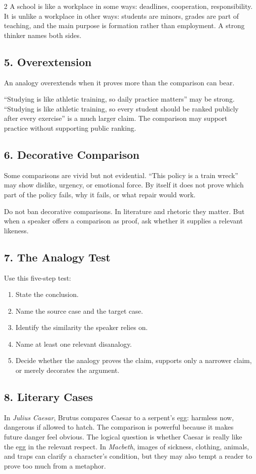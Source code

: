 \documentclass[12pt]{article}
\begin{document}
\begin{multicols}{2}
A school is like a workplace in some ways: deadlines, cooperation, responsibility. It is unlike a workplace in other ways: students are minors, grades are part of teaching, and the main purpose is formation rather than employment. A strong thinker names both sides.

\subsection*{5. Overextension}
An analogy overextends when it proves more than the comparison can bear.

``Studying is like athletic training, so daily practice matters'' may be strong. ``Studying is like athletic training, so every student should be ranked publicly after every exercise'' is a much larger claim. The comparison may support practice without supporting public ranking.

\subsection*{6. Decorative Comparison}
Some comparisons are vivid but not evidential. ``This policy is a train wreck'' may show dislike, urgency, or emotional force. By itself it does not prove which part of the policy fails, why it fails, or what repair would work.

Do not ban decorative comparisons. In literature and rhetoric they matter. But when a speaker offers a comparison as proof, ask whether it supplies a relevant likeness.

\subsection*{7. The Analogy Test}
Use this five-step test:
\begin{enumerate}[leftmargin=*,itemsep=0.12em]
\item State the conclusion.
\item Name the source case and the target case.
\item Identify the similarity the speaker relies on.
\item Name at least one relevant disanalogy.
\item Decide whether the analogy proves the claim, supports only a narrower claim, or merely decorates the argument.
\end{enumerate}

\subsection*{8. Literary Cases}
In \textit{Julius Caesar}, Brutus compares Caesar to a serpent's egg: harmless now, dangerous if allowed to hatch. The comparison is powerful because it makes future danger feel obvious. The logical question is whether Caesar is really like the egg in the relevant respect. In \textit{Macbeth}, images of sickness, clothing, animals, and traps can clarify a character's condition, but they may also tempt a reader to prove too much from a metaphor.


\end{multicols}
\end{document}
